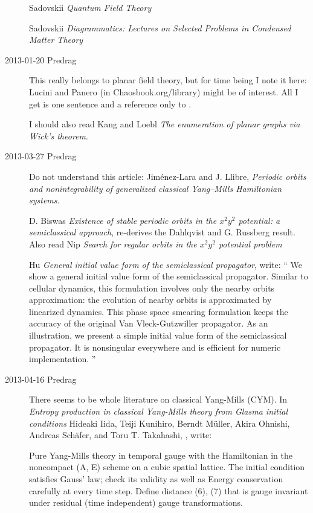 \begin{description}
Sadovskii {\em Quantum Field Theory}

Sadovskii
{\em Diagrammatics: Lectures on Selected Problems in Condensed Matter Theory}





\item[2013-01-20  Predrag]
This really belongs to planar field theory, but for time being I note
it here: Lucini and Panero (in Chaosbook.org/library)
might be of interest. All I get is one sentence and a reference only
to .

I should also read Kang and Loebl
{\em The enumeration of planar graphs via {Wick}'s theorem}.

\item[2013-03-27  Predrag] Do not understand this article:
Jim\'enez-Lara and J. Llibre,
{\em Periodic orbits and nonintegrability of generalized
classical {Yang--Mills Hamiltonian} systems}.

                                                \toCB
D. Biswas \etal{} {\em Existence of stable periodic orbits
in the $x^2y^2$ potential: a semiclassical approach}, re-derives the
Dahlqvist and G. Russberg result. Also read Nip
\etal{} {\em Search for regular orbits in the $x^2y^2$
potential problem}

Hu
{\em General initial value form of the semiclassical propagator},
write: ``
We show a general initial value form of the semiclassical propagator.
Similar to cellular dynamics, this formulation involves only the
nearby orbits approximation: the evolution of nearby orbits is
approximated by linearized dynamics. This phase space smearing
formulation keeps the accuracy of the original Van Vleck-Gutzwiller
propagator. As an illustration, we present a simple initial value
form of the semiclassical propagator. It is nonsingular everywhere
and is efficient for numeric implementation.
''

\item[2013-04-16  Predrag] There seems to be whole literature on
classical Yang-Mills (CYM). In
{\em Entropy production in classical Yang-Mills theory from Glasma
initial conditions} Hideaki Iida,  Teiji Kunihiro,  Berndt M\"uller,
Akira Ohnishi,  Andreas Sch\"afer,  and Toru T. Takahashi,
, %
write:

Pure Yang-Mills theory in temporal gauge with the Hamiltonian in the
noncompact (A, E) scheme on a cubic spatial lattice. The initial
condition satisfies Gauss' law; check its validity as well as Energy
conservation carefully at every time step. Define distance (6), (7) that
is gauge invariant under residual (time independent) gauge transformations.


\end{description}
